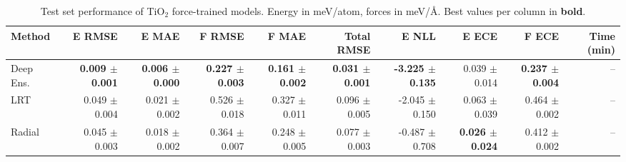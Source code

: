 \begin{table}
\centering
\caption{Test set performance of TiO$_2$ force-trained models. Energy in meV/atom, forces in meV/\AA{}. Best values per column in \textbf{bold}.}
\label{tab:tio2_results}
\begin{tabular}{lrrrrrrrrr}
\toprule
Method & E RMSE & E MAE & F RMSE & F MAE & Total RMSE & E NLL & E ECE & F ECE & Time (min) \\
\midrule
Deep Ens. & \textbf{0.009 $\pm$ 0.001} & \textbf{0.006 $\pm$ 0.000} & \textbf{0.227 $\pm$ 0.003} & \textbf{0.161 $\pm$ 0.002} & \textbf{0.031 $\pm$ 0.001} & \textbf{-3.225 $\pm$ 0.135} & 0.039 $\pm$ 0.014 & \textbf{0.237 $\pm$ 0.004} & -- \\
LRT & 0.049 $\pm$ 0.004 & 0.021 $\pm$ 0.002 & 0.526 $\pm$ 0.018 & 0.327 $\pm$ 0.011 & 0.096 $\pm$ 0.005 & -2.045 $\pm$ 0.150 & 0.063 $\pm$ 0.039 & 0.464 $\pm$ 0.002 & -- \\
Radial & 0.045 $\pm$ 0.003 & 0.018 $\pm$ 0.002 & 0.364 $\pm$ 0.007 & 0.248 $\pm$ 0.005 & 0.077 $\pm$ 0.003 & -0.487 $\pm$ 0.708 & \textbf{0.026 $\pm$ 0.024} & 0.412 $\pm$ 0.002 & -- \\
\bottomrule
\end{tabular}
\end{table}